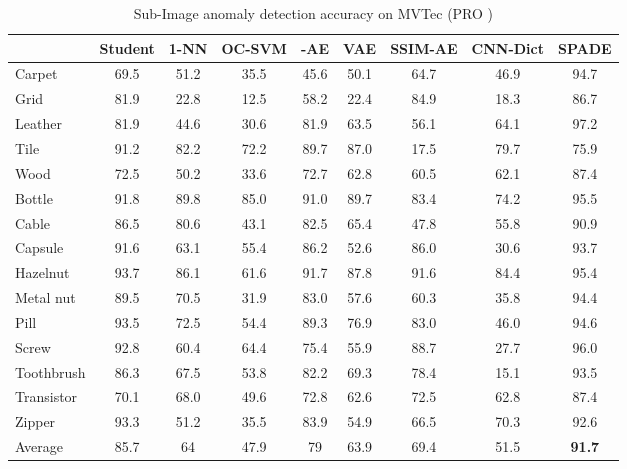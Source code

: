 \documentclass[runningheads]{llncs}
\begin{document}
\begin{table}[t]
  \centering
  \caption{Sub-Image anomaly detection accuracy on MVTec (PRO )}
  \label{tab:mvtec_pixel_pro}

    \begin{tabular}{lcccccccc}
    \toprule      

    & Student & 1-NN & OC-SVM  & -AE & VAE & SSIM-AE  & CNN-Dict & SPADE \\
    \midrule
Carpet	&			69.5	&	51.2	&	35.5	&	45.6	&	50.1	&	64.7	&	46.9	&	94.7		\\
Grid	&			81.9	&	22.8	&	12.5	&	58.2	&	22.4	&	84.9	&	18.3	&	86.7		\\
Leather	&			81.9	&	44.6	&	30.6	&	81.9	&	63.5	&	56.1	&	64.1	&	97.2		\\
Tile	&			91.2	&	82.2	&	72.2	&	89.7	&	87.0	&	17.5	&	79.7	&	75.9		\\
Wood	&			72.5	&	50.2	&	33.6	&	72.7	&	62.8	&	60.5	&	62.1	&	87.4		\\
Bottle	&			91.8	&	89.8	&	85.0	&	91.0	&	89.7	&	83.4	&	74.2	&	95.5		\\
Cable	&			86.5	&	80.6	&	43.1	&	82.5	&	65.4	&	47.8	&	55.8	&	90.9		\\
Capsule	&			91.6	&	63.1	&	55.4	&	86.2	&	52.6	&	86.0	&	30.6	&	93.7		\\
Hazelnut	&			93.7	&	86.1	&	61.6	&	91.7	&	87.8	&	91.6	&	84.4	&	95.4		\\
Metal nut	&			89.5	&	70.5	&	31.9	&	83.0	&	57.6	&	60.3	&	35.8	&	94.4		\\
Pill	&			93.5	&	72.5	&	54.4	&	89.3	&	76.9	&	83.0	&	46.0	&	94.6		\\
Screw	&			92.8	&	60.4	&	64.4	&	75.4	&	55.9	&	88.7	&	27.7	&	96.0		\\
Toothbrush	&			86.3	&	67.5	&	53.8	&	82.2	&	69.3	&	78.4	&	15.1	&	93.5		\\
Transistor	&			70.1	&	68.0	&	49.6	&	72.8	&	62.6	&	72.5	&	62.8	&	87.4		\\
Zipper	&			93.3	&	51.2	&	35.5	&	83.9	&	54.9	&	66.5	&	70.3	&	92.6		\\
\midrule																				
Average	&			85.7	&	64	&	47.9	&	79	&	63.9	&	69.4	&	51.5	&	\textbf{91.7}		\\																
	 \bottomrule
    \end{tabular}
\end{table}
\end{document}
